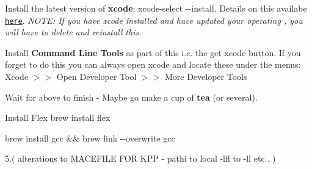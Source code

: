 
\begin{DoxyEnumerate}
\item Install the latest version of {\bfseries xcode}\+: {\ttfamily xcode-\/select -\/-\/install}. Details on this availabe \href{http://railsapps.github.io/xcode-command-line-tools.html}{\tt here}. {\itshape N\+O\+TE\+: If you have xcode installed and have updated your operating , you will have to delete and reinstall this.}
\item Install {\bfseries Command Line Tools} as part of this i.\+e. the \textquotesingle{}get xcode\textquotesingle{} button. If you forget to do this you can always open xcode and locate these under the menus\+: Xcode $>$$>$ Open Developer Tool $>$$>$ More Developer Tools
\item Wait for above to finish -\/ Maybe go make a cup of {\bfseries tea} (or several).
\item Install Flex {\ttfamily brew install flex}
\item {\ttfamily brew install gcc \&\& brew link -\/-\/overwrite gcc}
\end{DoxyEnumerate}

5.( alterations to M\+A\+C\+E\+F\+I\+LE F\+OR K\+PP -\/ pathi to local -\/lfl to -\/ll etc.. ) 